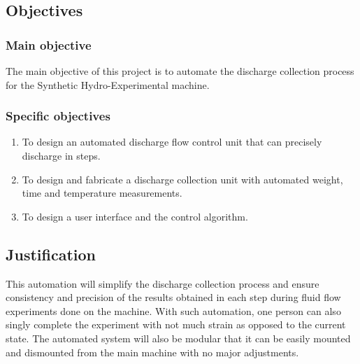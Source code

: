 \subsection{Objectives}
\subsubsection{Main objective}

The main objective of this project is to automate the discharge collection process for the Synthetic Hydro-Experimental machine. 

\subsubsection{Specific objectives}

\begin{enumerate}
	\item To design an automated discharge flow control unit that can precisely discharge in steps.
	\item To design and fabricate a discharge collection unit with automated weight, time and temperature measurements.
    \item To design a user interface and the control algorithm.

\end{enumerate}


\subsection{Justification}

This automation will simplify the discharge collection process and ensure consistency and precision of the results obtained in each step during fluid flow experiments done on the machine. With such automation, one person can also singly complete the experiment with not much strain as opposed to the current state. The automated system will also be modular that it can be easily mounted and dismounted from the main machine with no major adjustments.